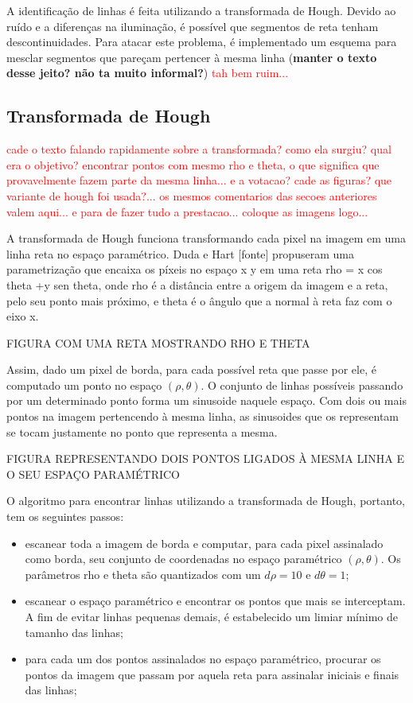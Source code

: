 A identificação de linhas é feita utilizando a transformada de Hough. Devido ao ruído e a diferenças na iluminação, é possível que segmentos de reta tenham descontinuidades. Para atacar este problema, é implementado um esquema para mesclar segmentos que pareçam pertencer à mesma linha (\textbf{manter o texto desse jeito? não ta muito informal?}) \textcolor{red}{tah bem ruim...}

\subsection{Transformada de Hough}

\textcolor{red}{cade o texto falando rapidamente sobre a transformada? como ela surgiu? qual era o objetivo? encontrar pontos com mesmo rho e theta, o que significa que provavelmente fazem parte da mesma linha... e a votacao? cade as figuras? que variante de hough foi usada?... os mesmos comentarios das secoes anteriores valem aqui... e para de fazer tudo a prestacao... coloque as imagens logo...}


A transformada de Hough funciona transformando cada pixel na imagem em uma linha reta no espaço paramétrico. Duda e Hart [fonte] propuseram uma parametrização que encaixa os píxeis no espaço x y em uma reta rho = x cos theta +y sen theta, onde rho é a distância entre a origem da imagem e a reta, pelo seu ponto mais próximo, e theta é o ângulo que a normal à reta faz com o eixo x.

FIGURA COM UMA RETA MOSTRANDO RHO E THETA

Assim, dado um pixel de borda, para cada possível reta que passe por ele, é computado um ponto no espaço $(\rho,\theta)$. O conjunto de linhas possíveis passando por um determinado ponto forma um sinusoide naquele espaço. Com dois ou mais pontos na imagem pertencendo à mesma linha, as sinusoides que os representam se tocam justamente no ponto que representa a mesma.

FIGURA REPRESENTANDO DOIS PONTOS LIGADOS À MESMA LINHA E O SEU ESPAÇO PARAMÉTRICO

O algoritmo para encontrar linhas utilizando a transformada de Hough, portanto, tem os seguintes passos: 
\begin{itemize}
\item escanear toda a imagem de borda e computar, para cada pixel assinalado como borda, seu conjunto de coordenadas no espaço paramétrico $(\rho,\theta)$. Os parâmetros rho e theta são quantizados com um $d\rho = 10$ e $d\theta = 1$;
\item escanear o espaço paramétrico e encontrar os pontos que mais se interceptam. A fim de evitar linhas pequenas demais, é estabelecido um limiar mínimo de tamanho das linhas;
\item para cada um dos pontos assinalados no espaço paramétrico, procurar os pontos da imagem que passam por aquela reta para assinalar iniciais e finais das linhas;
\end{itemize}

